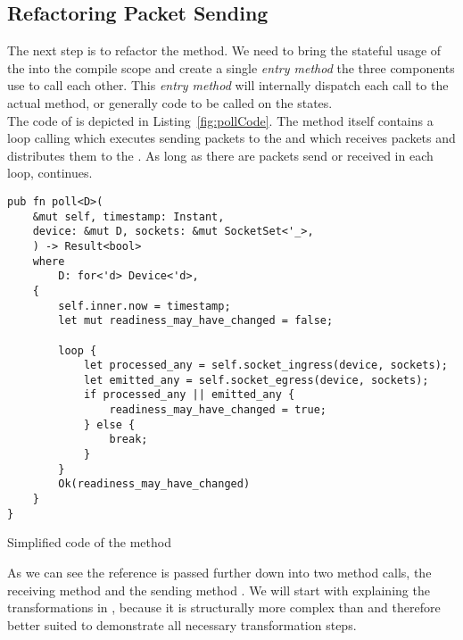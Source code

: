 \subsection{Refactoring Packet Sending}
The next step is to refactor the  method. We need to bring the stateful usage of the \dev{} into the compile scope and create a single \emph{entry method} the three 
components use to call each other. This \emph{entry method} will internally dispatch each call to the actual method, or generally code to be called on the states.\\

The code of  is depicted in Listing~\ref{fig:pollCode}. The method itself contains a loop calling  which executes sending packets to the  and  which receives packets and distributes them to the . As long as there are packets send or received in each loop,  continues. \\

\begin{codefigure}[H]
    \centering
    
\begin{verbatim}
pub fn poll<D>(
    &mut self, timestamp: Instant,
    device: &mut D, sockets: &mut SocketSet<'_>,
    ) -> Result<bool>
    where
        D: for<'d> Device<'d>,
    {
        self.inner.now = timestamp;
        let mut readiness_may_have_changed = false;

        loop {
            let processed_any = self.socket_ingress(device, sockets);
            let emitted_any = self.socket_egress(device, sockets);
            if processed_any || emitted_any {
                readiness_may_have_changed = true;
            } else {
                break;
            }
        }
        Ok(readiness_may_have_changed)
    }
}
\end{verbatim}
    \caption{Simplified code of the  method}
    \label{fig:pollCode}
\end{codefigure}

As we can see the \dev{} reference is passed further down into two method calls, the receiving method  and the sending method . We will start with explaining the transformations in , because it is structurally  more complex than  and therefore better suited to demonstrate all necessary transformation steps.

